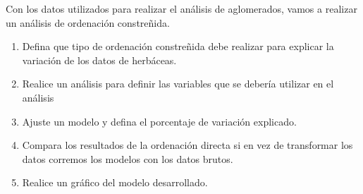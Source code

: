 \documentclass[]{book}
\begin{document}
Con los datos utilizados para realizar el análisis de aglomerados, vamos
a realizar un análisis de ordenación constreñida.

\begin{enumerate}
\def\labelenumi{\alph{enumi}.}
\item
  Defina que tipo de ordenación constreñida debe realizar para explicar
  la variación de los datos de herbáceas.
\item
  Realice un análisis para definir las variables que se debería utilizar
  en el análisis
\item
  Ajuste un modelo y defina el porcentaje de variación explicado.
\item
  Compara los resultados de la ordenación directa si en vez de
  transformar los datos corremos los modelos con los datos brutos.
\item
  Realice un gráfico del modelo desarrollado.
\end{enumerate}


\end{document}
